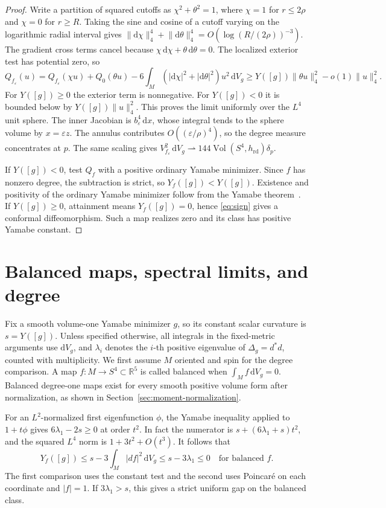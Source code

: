 \documentclass[11pt]{article}
\numberwithin{equation}{section}
\DeclareMathOperator{\Vol}{Vol}
\newcommand{\rd}{\mathrm{rd}}
\newcommand{\dd}{\mathrm{d}}
\newcommand{\e}{\varepsilon}
\newcommand{\RR}{\mathbb{R}}
\newcommand{\abs}[1]{\lvert #1\rvert}
\newcommand{\norm}[1]{\lVert #1\rVert}
\newcommand{\dv}{\dd V_g}
\newcommand{\Y}{Y([g])}
\newcommand{\Yf}{Y_f([g])}
\begin{document}
\begin{proof}
Write a partition of squared cutoffs as
\(\chi^2+\theta^2=1\), where \(\chi=1\) for \(r\le2\rho\)
and \(\chi=0\) for \(r\ge R\). Taking the sine and cosine of a
cutoff varying on the logarithmic radial interval gives
\(\norm{\dd\chi}_4^4+\norm{\dd\theta}_4^4=O(\log(R/(2\rho))^{-3})\).
The gradient cross terms cancel because
\(\chi\,\dd\chi+\theta\,\dd\theta=0\). The localized exterior
test has potential zero, so
\[
 Q_{f_\e}(u)=Q_{f_\e}(\chi u)+Q_0(\theta u)
     -6\int_M(\abs{\dd\chi}^2+\abs{\dd\theta}^2)u^2\,\dv
 \ge \Y\norm{\theta u}_4^2-o(1)\norm u_4^2 .
\]
For \(\Y\ge0\) the exterior term is nonnegative. For \(\Y<0\) it
is bounded below by \(\Y\norm u_4^2\). This proves the limit
uniformly over the \(L^4\) unit sphere. The inner Jacobian is
\(b_\e^4\,\dd x\), whose integral tends to the sphere volume by
\(x=\e z\). The annulus contributes \(O((\e/\rho)^4)\), so
the degree measure concentrates at \(p\).
The same scaling gives
\(V_{f_\e}^2\,\dv\rightharpoonup144\Vol(S^4,h_{\rd})\delta_p\).

If \(\Y<0\), test \(Q_f\) with a positive ordinary Yamabe minimizer.
Since \(f\) has nonzero degree, the subtraction is strict, so
\(\Yf<\Y\). Existence and positivity of the ordinary Yamabe
minimizer follow from the Yamabe theorem~\cite{LeeParker1987Yamabe,Schoen1984Yamabe}.
If \(\Y\ge0\), attainment means \(\Yf=0\), hence \eqref{eq:sign}
gives a conformal diffeomorphism. Such a map realizes zero
and its class has positive Yamabe constant.
\end{proof}

\section{Balanced maps, spectral limits, and degree}\label{sec:balanced}

Fix a smooth volume-one Yamabe minimizer \(g\), so its constant
scalar curvature is \(s=\Y\). Unless specified otherwise, all
integrals in the fixed-metric arguments use \(\dv\), and
\(\lambda_i\) denotes the \(i\)-th positive eigenvalue of
\(\Delta_g=d^*d\), counted with multiplicity. We first assume
\(M\) oriented and spin for the degree comparison. A map
\(f:M\to S^4\subset\RR^5\) is called balanced when
\(\int_M f\,\dv=0\). Balanced degree-one maps exist for every
smooth positive volume form after normalization, as shown in
Section~\ref{sec:moment-normalization}.

For an \(L^2\)-normalized first eigenfunction \(\phi\), the Yamabe
inequality applied to \(1+t\phi\) gives \(6\lambda_1-2s\ge0\)
at order \(t^2\). In fact the numerator is
\(s+(6\lambda_1+s)t^2\), and the squared \(L^4\) norm is
\(1+3t^2+O(t^3)\). It follows that
\begin{equation}\label{eq:balance-chain}
 \Yf\le s-3\int_M\abs{df}^2\,\dv\le s-3\lambda_1\le0
 \quad\text{for balanced } f .
\end{equation}
The first comparison uses the constant test and the second
uses Poincar\'e on each coordinate and \(\abs f=1\).
If \(3\lambda_1>s\), this gives a strict uniform gap on the
balanced class.
\end{document}
